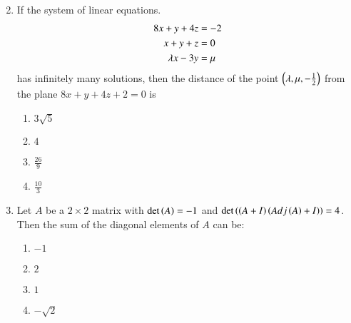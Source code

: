 \documentclass[journal]{IEEEtran}
\begin{document}
\begin{enumerate}
\begin{multicols}{2}
     \end{multicols}
     \item If the system of linear equations.
     \begin{align}
         8x+y+4z &= -2         \notag\\ 
         x+y+z &= 0             \notag\\
         \lambda x-3y &= \mu     \notag
     \end{align}
     has infinitely many solutions, then the distance of the point $\left(\lambda,\mu,-\frac{1}{2}\right)$ from the plane $8x +y+4z+2=0$ is
     \begin{multicols}{2}
     \begin{enumerate}
         \item $3\sqrt{5}$
         \item $4$
         \item $\frac{26}{9}$
         \item $\frac{10}{3}$
     \end{enumerate}
        \end{multicols}
    \item Let $A$ be a $2 \times 2$ matrix with $\det\left(A\right)= -1$ and $\det\left(\left(A+I\right)\left(Adj\left(A\right)+I\right)\right) = 4$. Then the sum of the diagonal elements of $A$ can be:
    \begin{multicols}{2}
        \begin{enumerate}
            \item $-1$
            \item $2$
            \item $1$
            \item $-\sqrt{2}$
            

\end{enumerate}
\end{multicols}
\end{enumerate}
\end{document}
